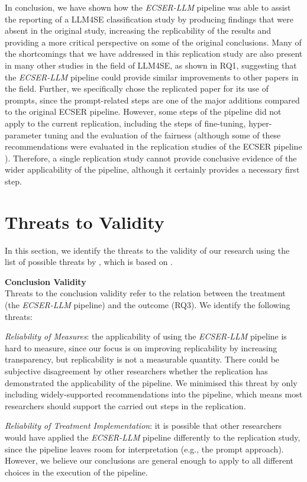 \documentclass[a4paper]{article}
\newcommand{\newecser}{\textit{ECSER-LLM} }
\begin{document}
In conclusion, we have shown how the \newecser pipeline was able to assist the reporting of a LLM4SE classification study by producing findings that were absent in the original study, increasing the replicability of the results and providing a more critical perspective on some of the original conclusions. Many of the shortcomings that we have addressed in this replication study are also present in many other studies in the field of LLM4SE, as shown in RQ1, suggesting that the \newecser pipeline could provide similar improvements to other papers in the field. Further, we specifically chose the replicated paper for its use of prompts, since the prompt-related steps are one of the major additions compared to the original ECSER pipeline. However, some steps of the pipeline did not apply to the current replication, including the steps of fine-tuning, hyper-parameter tuning and the evaluation of the fairness (although some of these recommendations were evaluated in the replication studies of the ECSER pipeline \cite{Dellanna2022}). Therefore, a single replication study cannot provide conclusive evidence of the wider applicability of the pipeline, although it certainly provides a necessary first step. 

\section{Threats to Validity}
\label{threats-to-validity}
In this section, we identify the threats to the validity of our research using the list of possible threats by \textcite{Wohlin2024validity}, which is based on \textcite{Cook1979validity}. 

\textbf{Conclusion Validity} \\
Threats to the conclusion validity refer to the relation between the treatment (the \newecser pipeline) and the outcome (RQ3). We identify the following threats:

\textit{Reliability of Measures}: the applicability of using the \newecser pipeline is hard to measure, since our focus is on improving replicability by increasing transparency, but replicability is not a measurable quantity. There could be subjective disagreement by other researchers whether the replication has demonstrated the applicability of the pipeline. We minimised this threat by only including widely-supported recommendations into the pipeline, which means most researchers should support the carried out steps in the replication.

\textit{Reliability of Treatment Implementation}: it is possible that other researchers would have applied the \newecser pipeline differently to the replication study, since the pipeline leaves room for interpretation (e.g., the prompt approach). However, we believe our conclusions are general enough to apply to all different choices in the execution of the pipeline.
\end{document}
